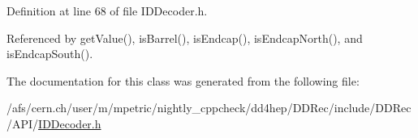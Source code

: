 Definition at line 68 of file I\+D\+Decoder.\+h.



Referenced by get\+Value(), is\+Barrel(), is\+Endcap(), is\+Endcap\+North(), and is\+Endcap\+South().



The documentation for this class was generated from the following file\+:\begin{DoxyCompactItemize}
\item 
/afs/cern.\+ch/user/m/mpetric/nightly\+\_\+cppcheck/dd4hep/\+D\+D\+Rec/include/\+D\+D\+Rec/\+A\+P\+I/\hyperlink{_i_d_decoder_8h}{I\+D\+Decoder.\+h}\end{DoxyCompactItemize}
